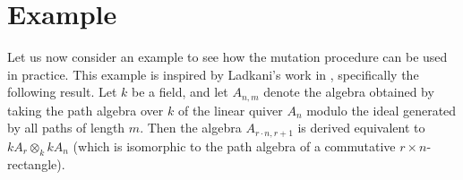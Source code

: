 \documentclass[12pt, dvipsnames, oneside]{amsart}
\theoremstyle{definition}
\begin{document}
\vfill



















\section{Example}\label{section:example}
Let us now consider an example to see how the mutation procedure can be used in practice. This example is inspired by Ladkani's work in \cite{Ladkani2013}, specifically the following result. Let $k$ be a field, and let $A_{n,m}$ denote the algebra obtained by taking the path algebra over $k$ of the linear quiver $A_{n}$ modulo the ideal generated by all paths of length $m$. Then the algebra $A_{r\cdot n ,r+1}$ is derived equivalent to $kA_r\otimes_k kA_n$ (which is isomorphic to the path algebra of a commutative $r\times n$-rectangle).
\end{document}
